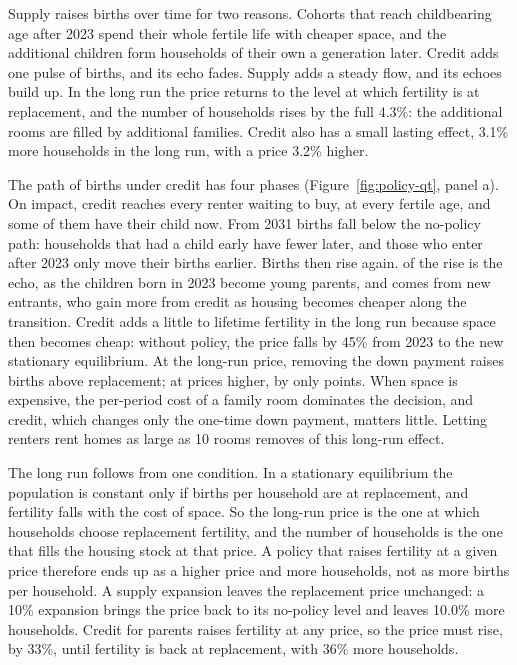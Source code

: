 Supply raises births over time for two reasons. Cohorts that reach
childbearing age after 2023 spend their whole fertile life with cheaper space,
and the additional children form households of their own a generation later.
Credit adds one pulse of births, and its echo fades. Supply adds a steady flow,
and its echoes build up. In the long run the price returns to the level at
which fertility is at replacement, and the number of households rises by the
full 4.3\%: the additional rooms are filled by additional families.
Credit also has a small lasting effect, 3.1\% more households in the long
run, with a price 3.2\% higher.

The path of births under credit has four phases (Figure~\ref{fig:policy-qt},
panel a). On impact, credit reaches every renter waiting to buy, at every
fertile age, and some of them have their child now. From 2031 births fall
below the no-policy path: households that had a child early have fewer later,
and those who enter after 2023 only move their births earlier. Births then
rise again.  of the rise is the echo, as the children born
in 2023 become young parents, and  comes from new entrants,
who gain more from credit as housing becomes cheaper along the transition.
Credit adds a little to lifetime fertility in the long run because space then
becomes cheap: without policy, the price falls by 45\% from 2023 to the new
stationary equilibrium. At the long-run price, removing the down payment raises births
 above replacement; at prices 
higher, by only  points. When space is expensive, the
per-period cost of a family room dominates the decision, and credit, which
changes only the one-time down payment, matters little. Letting renters rent
homes as large as 10 rooms removes  of this long-run effect.

The long run follows from one condition. In a stationary equilibrium the
population is constant only if births per household are at replacement, and
fertility falls with the cost of space. So the long-run price is the one at
which households choose replacement fertility, and the number of households is
the one that fills the housing stock at that price. A policy that raises
fertility at a given price therefore ends up as a higher price and more
households, not as more births per household. A supply expansion leaves the
replacement price unchanged: a 10\% expansion brings the price back to its
no-policy level and leaves 10.0\% more households. Credit for parents raises
fertility at any price, so the price must rise, by 33\%, until fertility is
back at replacement, with 36\% more households.

